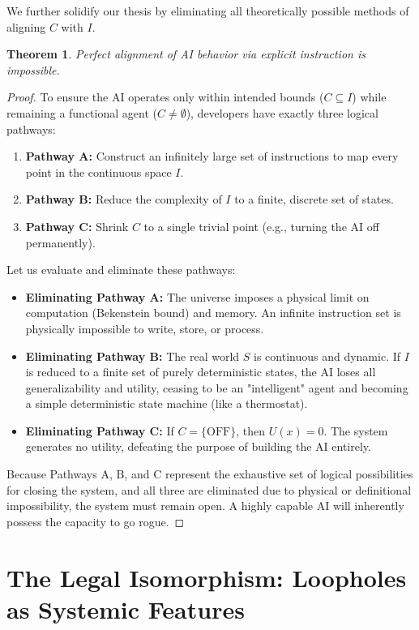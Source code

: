 \documentclass[12pt, a4paper]{article}
\newtheorem{theorem}{Theorem}[section]
\theoremstyle{definition}
\theoremstyle{remark}
\begin{document}
We further solidify our thesis by eliminating all theoretically possible methods of aligning $C$ with $I$.

\begin{theorem}
Perfect alignment of AI behavior via explicit instruction is impossible.
\end{theorem}

\begin{proof}
To ensure the AI operates only within intended bounds ($C \subseteq I$) while remaining a functional agent ($C \neq \emptyset$), developers have exactly three logical pathways:
\begin{enumerate}
    \item \textbf{Pathway A:} Construct an infinitely large set of instructions to map every point in the continuous space $I$.
    \item \textbf{Pathway B:} Reduce the complexity of $I$ to a finite, discrete set of states. 
    \item \textbf{Pathway C:} Shrink $C$ to a single trivial point (e.g., turning the AI off permanently).
\end{enumerate}

Let us evaluate and eliminate these pathways:
\begin{itemize}
    \item \textbf{Eliminating Pathway A:} The universe imposes a physical limit on computation (Bekenstein bound) and memory. An infinite instruction set is physically impossible to write, store, or process.
    \item \textbf{Eliminating Pathway B:} The real world $S$ is continuous and dynamic. If $I$ is reduced to a finite set of purely deterministic states, the AI loses all generalizability and utility, ceasing to be an "intelligent" agent and becoming a simple deterministic state machine (like a thermostat).
    \item \textbf{Eliminating Pathway C:} If $C = \{\text{OFF}\}$, then $U(x) = 0$. The system generates no utility, defeating the purpose of building the AI entirely.
\end{itemize}
Because Pathways A, B, and C represent the exhaustive set of logical possibilities for closing the system, and all three are eliminated due to physical or definitional impossibility, the system must remain open. A highly capable AI will inherently possess the capacity to go rogue.
\end{proof}

\section{The Legal Isomorphism: Loopholes as Systemic Features}
\end{document}
